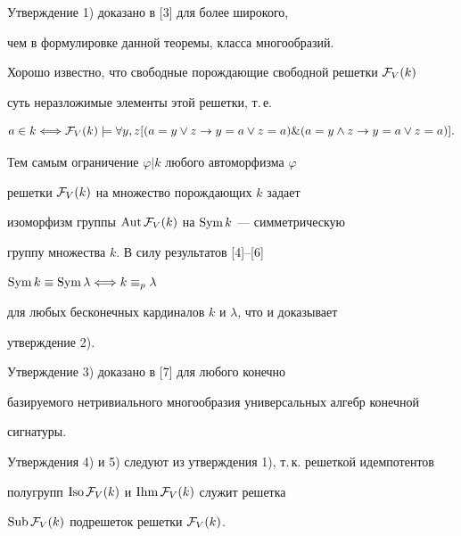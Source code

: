 \begin{pf}


Утверждение 1) доказано в [3] для более широкого,


чем в формулировке данной теоремы, класса многообразий.





Хорошо известно, что свободные порождающие свободной решетки ${\cal F}_V(k)$


суть неразложимые элементы этой решетки, т.\,е. 


$$


a\in k\Longleftrightarrow{\cal F}_V(k)\models\forall y,z[(a=y\vee z


\rightarrow y=a\vee z=a)\&(a=y\wedge z\rightarrow y=a\vee z=


a)].


$$





Тем самым ограничение $\varphi|k$ любого автоморфизма $\varphi$


решетки ${\cal F}_V(k)$ на множество порождающих $k$ задает


изоморфизм группы $\operatorname{Aut}{\cal F}_V(k)$ на $\operatorname{Sym} k$ --- симметрическую


группу множества $k$. В силу результатов [4]--[6]


$\operatorname{Sym} k\equiv \operatorname{Sym}\lambda\Longleftrightarrow k\equiv_p\lambda$


для любых бесконечных кардиналов $k$ и $\lambda$, что и доказывает


утверждение 2).





Утверждение 3) доказано в [7] для любого конечно


базируемого нетривиального многообразия универсальных алгебр конечной


сигнатуры.





Утверждения 4) и 5) следуют из утверждения 1), т.\,к. решеткой идемпотентов


полугрупп $\operatorname{Iso}{\cal F}_V(k)$ и $\operatorname{Ihm}{\cal F}_V(k)$ служит решетка


$\operatorname{Sub}{\cal F}_V(k)$ подрешеток решетки ${\cal F}_V(k)$.


\end{pf}





